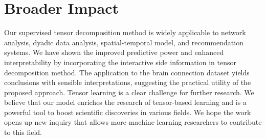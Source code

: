\documentclass{article}
\theoremstyle{definition}
\theoremstyle{definition}
\begin{document}
\newpage 
\section*{Broader Impact}

Our supervised tensor decomposition method is widely applicable to network analysis, dyadic data analysis, spatial-temporal model, and recommendation systems. We have shown the improved predictive power and enhanced interpretability by incorporating the interactive side information in tensor decomposition method.  The application to the brain connection dataset yields conclusions with sensible interpretations, suggesting the practical utility of the proposed approach.  Tensor learning is a clear challenge for further research. We believe that our model enriches the research of tensor-based learning and is a powerful tool to boost scientific discoveries in various fields. We hope the work opens up new inquiry that allows more machine learning researchers to contribute to this field.





\end{document}
